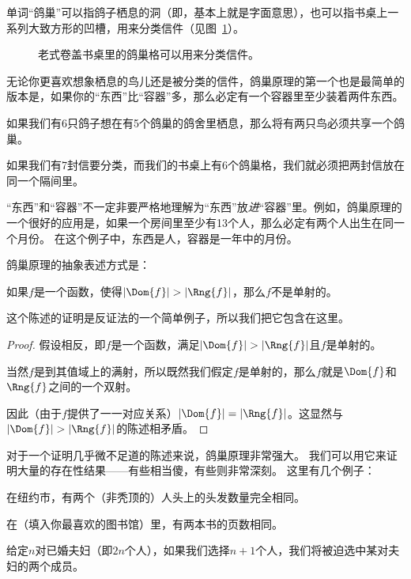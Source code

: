 单词“鸽巢”可以指鸽子栖息的洞（即，基本上就是字面意思），也可以指书桌上一系列大致方形的凹槽，用来分类信件（见图~\ref{fig:roll_top}）。

\begin{figure}[!hbtp]
\begin{center}

\end{center}
\caption[带鸽巢格的书桌。]{老式卷盖书桌里的鸽巢格可以用来分类信件。}
\label{fig:roll_top} 
\end{figure}

无论你更喜欢想象栖息的鸟儿还是被分类的信件，鸽巢原理的第一个也是最简单的版本是，如果你的“东西”比“容器”多，那么必定有一个容器里至少装着两件东西。

如果我们有6只鸽子想在有5个鸽巢的鸽舍里栖息，那么将有两只鸟必须共享一个鸽巢。

如果我们有7封信要分类，而我们的书桌上有6个鸽巢格，我们就必须把两封信放在同一个隔间里。

“东西”和“容器”不一定非要严格地理解为“东西”放\emph{进}“容器”里。例如，鸽巢原理的一个很好的应用是，如果一个房间里至少有13个人，那么必定有两个人出生在同一个月份。
在这个例子中，东西是人，容器是一年中的月份。

鸽巢原理的抽象表述方式是：

\begin{thm}
如果$f$是一个函数，使得$|\Dom{f}| > |\Rng{f}|$，那么$f$不是单射的。
\end{thm}

这个陈述的证明是反证法的一个简单例子，所以我们把它包含在这里。

\begin{proof}
假设相反，即$f$是一个函数，满足$|\Dom{f}| > |\Rng{f}|$且$f$是单射的。

当然$f$是到其值域上的满射，所以既然我们假定$f$是单射的，那么$f$就是$\Dom{f}$和$\Rng{f}$之间的一个双射。

因此（由于$f$提供了一一对应关系）$|\Dom{f}| = |\Rng{f}|$。这显然与$|\Dom{f}| > |\Rng{f}|$的陈述相矛盾。
\end{proof}

对于一个证明几乎微不足道的陈述来说，鸽巢原理非常强大。
我们可以用它来证明大量的存在性结果——有些相当傻，有些则非常深刻。
这里有几个例子：

在纽约市，有两个（非秃顶的）人头上的头发数量完全相同。

在（填入你最喜欢的图书馆）里，有两本书的页数相同。

给定$n$对已婚夫妇（即$2n$个人），如果我们选择$n+1$个人，我们将被迫选中某对夫妇的两个成员。

